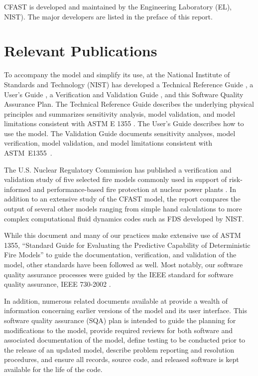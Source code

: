 \documentclass[12pt]{book}
\begin{document}
CFAST is developed and maintained by the Engineering Laboratory (EL), NIST). The major developers are listed in the preface of this report.

\section{Relevant Publications}

To accompany the model and simplify its use, at the National Institute of Standards and Technology (NIST) has developed a Technical Reference Guide \cite{CFAST_Tech_Guide_7}, a User's Guide \cite{CFAST_Users_Guide_7}, a Verification and Validation Guide \cite{CFAST_Valid_Guide_7}, and this Software Quality Assurance Plan.  The Technical Reference Guide describes the underlying physical principles and summarizes sensitivity analysis, model validation, and model limitations consistent with ASTM E 1355 \cite{ASTM:E1355}.  The User's Guide describes how to use the model.  The Validation Guide documents sensitivity analyses, model verification, model validation, and model limitations consistent with ASTM~E1355~\cite{ASTM:E1355}.

The U.S. Nuclear Regulatory Commission has published a verification and validation study of five selected fire models commonly used in support of risk-informed and performance-based fire protection at nuclear power plants \cite{NRCNUREG1824}. In addition to an extensive study of the CFAST model, the report compares the output of several other models ranging from simple hand calculations to more complex computational fluid dynamics codes such as FDS developed by NIST.

While this document and many of our practices make extensive use of ASTM 1355, ``Standard Guide for Evaluating the Predictive Capability of Deterministic Fire Models'' \cite{ASTM:E1355} to guide the documentation, verification, and validation of the model, other standards have been followed as well.  Most notably, our software quality assurance processes were guided by the IEEE standard for software quality assurance, IEEE 730-2002 \cite{IEEE:730}.

In addition, numerous related documents available at \href{http://cfast.nist.gov}{} provide a wealth of information concerning earlier versions of the model and its user interface. This software quality assurance (SQA) plan is intended to guide the planning for modifications to the model, provide required reviews for both software and associated documentation of the model, define testing to be conducted prior to the release of an updated model, describe problem reporting and resolution procedures, and ensure all records, source code, and released software is kept available for the life of the code.
\end{document}
